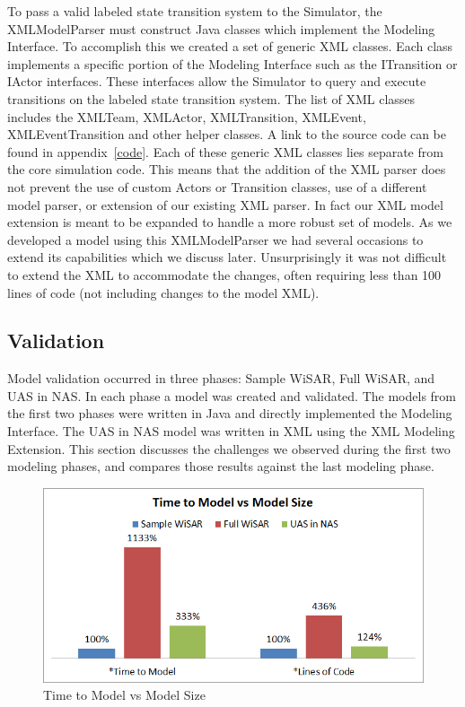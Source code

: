 To pass a valid labeled state transition system to the Simulator, the XMLModelParser must construct Java classes which implement the Modeling Interface.  To accomplish this we created a set of generic XML classes.  Each class implements a specific portion of the Modeling Interface such as the ITransition or IActor interfaces.  These interfaces allow the Simulator to query and execute transitions on the labeled state transition system.  The list of XML classes includes the XMLTeam, XMLActor, XMLTransition, XMLEvent, XMLEventTransition and other helper classes.  A link to the source code can be found in appendix~\ref{code}.  Each of these generic XML classes lies separate from the core simulation code.  This means that the addition of the XML parser does not prevent the use of custom Actors or Transition classes, use of a different model parser, or extension of our existing XML parser.  In fact our XML model extension is meant to be expanded to handle a more robust set of models.   As we developed a model using this XMLModelParser we had several occasions to extend its capabilities which we discuss later.  Unsurprisingly it was not difficult to extend the XML to accommodate the changes, often requiring less than 100 lines of code (not including changes to the model XML).

\subsection{Validation}

Model validation occurred in three phases: Sample WiSAR, Full WiSAR, and UAS in NAS.  In each phase a model was created and validated.  The models from the first two phases were written in Java and directly implemented the Modeling Interface.  The UAS in NAS model was written in XML using the XML Modeling Extension.  This section discusses the challenges we observed during the first two modeling phases, and compares those results against the last modeling phase.

\begin{figure}[h]
\begin{center}
\includegraphics[width=5in]{time_to_model.png}
\caption{Time to Model vs Model Size}
\label{fig:time_to_model}
\end{center}
\end{figure}

